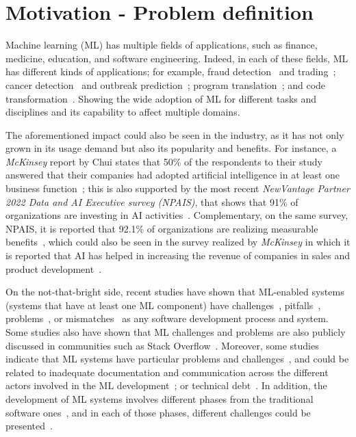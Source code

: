 
\section{Motivation - Problem definition}
\label{sec:motiv}

Machine learning (ML) has multiple fields of applications,  such as finance, medicine, education,  and software engineering. Indeed, in each  of these fields, ML has different kinds of applications; for example, fraud detection~\cite{awoyemi2017credit} and trading~\cite{sebastiao2021forecasting};  cancer detection~\cite{saba2020recent} and outbreak prediction~\cite{ardabili2020covid};  program translation~\cite{roziere2020unsupervised}; and code transformation~\cite{tufano2019learning}. Showing the wide adoption of ML for different tasks and disciplines and its capability to affect  multiple domains. 

The aforementioned  impact could also be seen in the industry, as it has not only grown in its usage demand but also its popularity and benefits.  For instance, a \textit{McKinsey} report by Chui \etal states that 50\% of the respondents to their study answered that their companies had adopted artificial intelligence  in at least one business function~\cite{chui_hall_mayhew_singla_2022};  this is also supported by the most recent \textit{NewVantage Partner 2022 Data and AI Executive survey (NPAIS)}, that  shows that 91\% of organizations are investing in AI activities~\cite{bean_2022}. Complementary,  on the same survey, NPAIS, it is reported that 92.1\% of organizations are realizing measurable benefits~\cite{bean_2022}, which could also be seen in the survey realized by  \textit{McKinsey} in which it is reported that AI has helped in increasing the revenue of companies in sales and product development~\cite{chui_hall_mayhew_singla_2022}. 


On the not-that-bright side,  recent studies have shown that ML-enabled systems (\ie systems that have at least one ML component)  have  challenges~\cite{Alshangiti_2019}, pitfalls~\cite{bone2015applying, biderman2020pitfalls, MichaelLones2021}, problems~\cite{sculley2015hidden}, or mismatches~\cite{LewisGrace2021WAIN} as any software development process and system. Some studies also have shown that  ML challenges and problems are also  publicly discussed in communities  such as Stack Overflow~\cite{Alshangiti_2019, Islam_2019, hamidi2021towards}. Moreover, some studies indicate that ML systems have particular problems and challenges~\cite{LewisGrace2021WAIN, sculley2015hidden}, and could be related to inadequate documentation and communication across the different actors involved in the ML development~\cite{LewisGrace2021WAIN}; or technical debt~\cite{sculley2015hidden}.   In addition,  the development of ML systems involves different phases from the traditional software ones~\cite{amershi2019software}, and in each of those phases, different challenges could be presented~\cite{LewisGrace2021WAIN, Alshangiti_2019, hamidi2021towards}.


